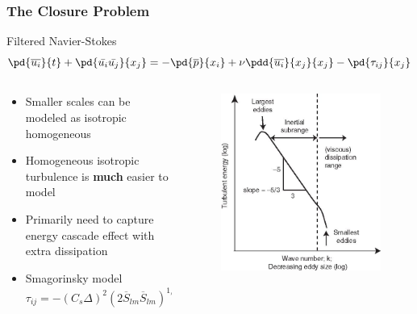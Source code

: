 \documentclass{beamer}
\begin{document}
\begin{frame}\frametitle{The Closure Problem}
\begin{block}{Filtered Navier-Stokes}
\[
\pd{\overline{u_i}}{t}+\pd{\bar{u_i}\bar{u_j}}{x_j}=-\pd{\overline{p}}{x_i}
+\nu\pdd{\overline{u_i}}{x_j}{x_j}-\pd{\tau_{ij}}{x_j}
\]
\end{block}
\begin{columns}[c]
\begin{column}{0.6\textwidth}
\begin{itemize}
\item Smaller scales can be modeled as isotropic homogeneous
\item Homogeneous isotropic turbulence is \textbf{much} easier to model
\item Primarily need to capture energy cascade effect with extra dissipation
\item Smagorinsky model
\[
\tau_{ij}=-(C_s\Delta)^2(2\overline{S}_{lm}\overline{S}_{lm})^{1/2}\overline{S}_{ij}
+\frac{1}{3}\tau_{kk}\delta_{ij}
\]
\end{itemize}
\end{column}
\begin{column}{0.4\textwidth}
\begin{figure}[t]
	\begin{center}
		\includegraphics[width=\textwidth]{spectrum.png}
	\end{center}
\end{figure}
\end{column}
\end{columns}
\end{frame}
\end{document}
